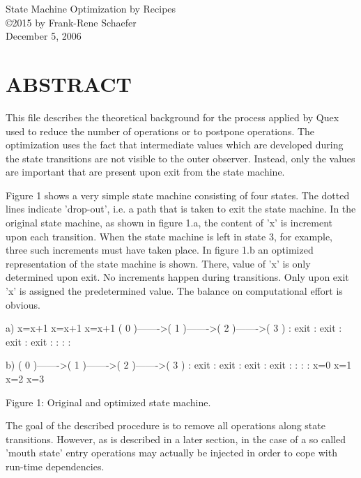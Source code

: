 \documentclass[12pt]{article}
\begin{document}
\begin{center}
{\large State Machine Optimization by Recipes} \\ 
\copyright 2015 by Frank-Rene Schaefer         \\
December 5, 2006
\end{center}

\section{ABSTRACT}

This file describes the theoretical background for the process applied by Quex
used to reduce the number of operations or to postpone operations.  The
optimization uses the fact that intermediate values which are developed during
the state transitions are not visible to the outer observer. Instead, only the
values are important that are present upon exit from the state machine.

Figure 1 shows a very simple state machine consisting of four states.  The
dotted lines indicate 'drop-out', i.e. a path that is taken to exit the state
machine.  In the original state machine, as shown in figure 1.a, the content of
'x' is increment upon each transition. When the state machine is left in state
3, for example, three such increments must have taken place. In figure 1.b an
optimized representation of the state machine is shown.  There, value of 'x' is
only determined upon exit.  No increments happen during transitions. Only upon
exit 'x' is assigned the predetermined value. The balance on computational
effort is obvious.

     
         a)          x=x+1        x=x+1        x=x+1
              ( 0 )------->( 1 )------->( 2 )------->( 3 )
                : exit       : exit       : exit       : exit
                :            :            :            :
    
         b)
              ( 0 )------->( 1 )------->( 2 )------->( 3 )
                : exit       : exit       : exit       : exit
                :            :            :            :
               x=0          x=1          x=2          x=3
    
             Figure 1: Original and optimized state machine.
                 
The goal of the described procedure is to remove all operations along state
transitions. However, as is described in a later section, in the case of a 
so called 'mouth state' entry operations may actually be injected in order
to cope with run-time dependencies.
\end{document}
